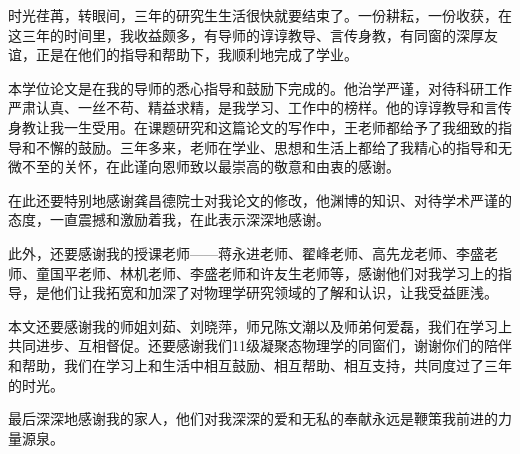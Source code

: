 \begin{thanks}

时光荏苒，转眼间，三年的研究生生活很快就要结束了。一份耕耘，一份收获，在这三年的时间里，我收益颇多，有导师的谆谆教导、言传身教，有同窗的深厚友谊，正是在他们的指导和帮助下，我顺利地完成了学业。

本学位论文是在我的导师的悉心指导和鼓励下完成的。他治学严谨，对待科研工作严肃认真、一丝不苟、精益求精，是我学习、工作中的榜样。他的谆谆教导和言传身教让我一生受用。在课题研究和这篇论文的写作中，王老师都给予了我细致的指导和不懈的鼓励。三年多来，老师在学业、思想和生活上都给了我精心的指导和无微不至的关怀，在此谨向恩师致以最崇高的敬意和由衷的感谢。

在此还要特别地感谢龚昌德院士对我论文的修改，他渊博的知识、对待学术严谨的态度，一直震撼和激励着我，在此表示深深地感谢。

此外，还要感谢我的授课老师——蒋永进老师、翟峰老师、高先龙老师、李盛老师、童国平老师、林机老师、李盛老师和许友生老师等，感谢他们对我学习上的指导，是他们让我拓宽和加深了对物理学研究领域的了解和认识，让我受益匪浅。

本文还要感谢我的师姐刘茹、刘晓萍，师兄陈文潮以及师弟何爱磊，我们在学习上共同进步、互相督促。还要感谢我们11级凝聚态物理学的同窗们，谢谢你们的陪伴和帮助，我们在学习上和生活中相互鼓励、相互帮助、相互支持，共同度过了三年的时光。

最后深深地感谢我的家人，他们对我深深的爱和无私的奉献永远是鞭策我前进的力量源泉。

\end{thanks}